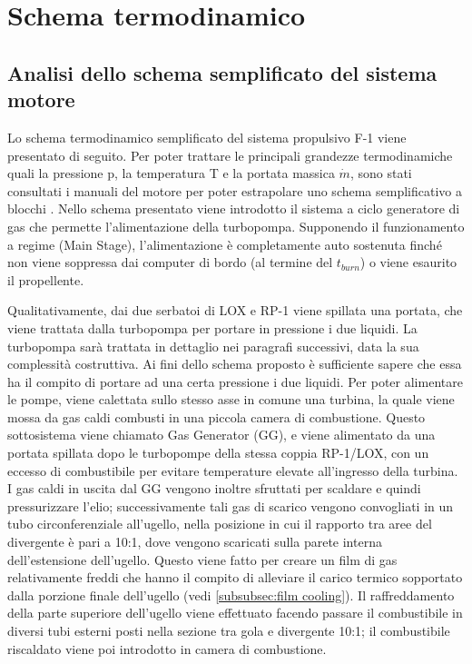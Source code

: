 \section{Schema termodinamico}
\label{sec:schema termodinamico}

\subsection{Analisi dello schema semplificato del sistema motore}
\label{subsec:schema semplificato}

Lo schema termodinamico semplificato del sistema propulsivo F-1 viene presentato di seguito. Per poter trattare le principali grandezze termodinamiche quali la pressione p, la temperatura T e la portata massica $ \dot{m} $, sono stati consultati i manuali del motore per poter estrapolare uno schema semplificativo a blocchi \cite{engine_manual}.
Nello schema presentato viene introdotto il sistema a ciclo generatore di gas che permette l’alimentazione della turbopompa. Supponendo il funzionamento a regime (Main Stage), l’alimentazione è completamente auto sostenuta finché non viene soppressa dai computer di bordo (al termine del $ t_{burn} $) o viene esaurito il propellente.

Qualitativamente, dai due serbatoi di LOX e RP-1 viene spillata una portata, che viene trattata dalla turbopompa per portare in pressione i due liquidi. La turbopompa sarà trattata in dettaglio nei paragrafi successivi, data la sua complessità costruttiva.
Ai fini dello schema proposto è sufficiente sapere che essa ha il compito di portare ad una certa pressione i due liquidi. Per poter alimentare le pompe, viene calettata sullo stesso asse in comune una turbina, la quale viene mossa da gas caldi combusti in una piccola camera di combustione.
Questo sottosistema viene chiamato Gas Generator (GG), e viene alimentato da una portata spillata dopo le turbopompe della stessa coppia RP-1/LOX, con un eccesso di combustibile per evitare temperature elevate all'ingresso della turbina.
I gas caldi in uscita dal GG vengono inoltre sfruttati per scaldare e quindi pressurizzare l’elio; successivamente tali gas di scarico vengono convogliati in un tubo circonferenziale all’ugello, nella posizione in cui il rapporto tra aree del divergente è pari a 10:1, dove vengono scaricati sulla parete interna dell’estensione dell’ugello.
Questo viene fatto per creare un film di gas relativamente freddi che hanno il compito di alleviare il carico termico sopportato dalla porzione finale dell'ugello (vedi \autoref{subsubsec:film cooling}).
Il raffreddamento della parte superiore dell’ugello viene effettuato facendo passare il combustibile in diversi tubi esterni posti nella sezione tra gola e divergente 10:1; il combustibile riscaldato viene poi introdotto in camera di combustione.

